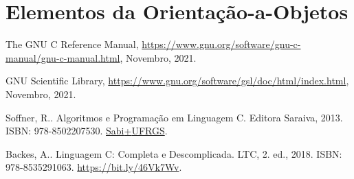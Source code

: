 \documentclass[12pt]{article}
\begin{document}
\section{Elementos da Orientação-a-Objetos}\label{sec_oo}

\badgeConstrucao

\ifisbook
\clearpage
{}
{}
\fi

\nocite{*}
\begin{thebibliography}{99}

  The GNU C Reference Manual, \url{https://www.gnu.org/software/gnu-c-manual/gnu-c-manual.html}, Novembro, 2021.
  
  GNU Scientific Library, \url{https://www.gnu.org/software/gsl/doc/html/index.html}, Novembro, 2021.
  
  Soffner, R.. Algoritmos e Programação em Linguagem C. Editora Saraiva, 2013. ISBN: 978-8502207530. \href{https://bit.ly/45VccHe}{Sabi{+}UFRGS}.

  Backes, A.. Linguagem C: Completa e Descomplicada. LTC, 2. ed., 2018. ISBN: 978-8535291063. \href{Sabi{+}UFRGS}{https://bit.ly/46Vk7Wv}.
  
\end{thebibliography}
\end{document}
